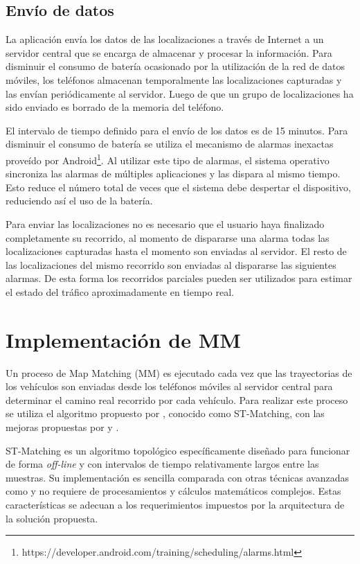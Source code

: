 \subsection{Envío de datos}

La aplicación envía los datos de las localizaciones a través de Internet a un servidor central que se encarga de almacenar y procesar la información. Para disminuir el consumo de batería ocasionado por la utilización de la red de datos móviles, los teléfonos almacenan temporalmente las localizaciones capturadas y las envían periódicamente al servidor. Luego de que un grupo de localizaciones ha sido enviado es borrado de la memoria del teléfono.

El intervalo de tiempo definido para el envío de los datos es de 15 minutos. Para disminuir el consumo de batería se utiliza el mecanismo de alarmas inexactas proveído por Android\footnote{https://developer.android.com/training/scheduling/alarms.html}. Al utilizar este tipo de alarmas, el sistema operativo sincroniza las alarmas de múltiples aplicaciones y las dispara al mismo tiempo. Esto reduce el número total de veces que el sistema debe despertar el dispositivo, reduciendo así el uso de la batería.

Para enviar las localizaciones no es necesario que el usuario haya finalizado completamente su recorrido, al momento de dispararse una alarma todas las localizaciones capturadas hasta el momento son enviadas al servidor. El resto de las localizaciones del mismo recorrido son enviadas al dispararse las siguientes alarmas. De esta forma los recorridos parciales pueden ser utilizados para estimar el estado del tráfico aproximadamente en tiempo real.

\section{Implementación de MM}
\label{implementacion_mm}

Un proceso de Map Matching (MM) es ejecutado cada vez que las trayectorias de los vehículos son enviadas desde los teléfonos móviles al servidor central para determinar el camino real recorrido por cada vehículo. Para realizar este proceso se utiliza el algoritmo propuesto por \citep{lou2009map}, conocido como ST-Matching, con las mejoras propuestas por \citep{budigm2012algorithm} y \citep{sakic2012map}. 

ST-Matching es un algoritmo topológico específicamente diseñado para funcionar de forma \emph{off-line} y con intervalos de tiempo relativamente largos entre las muestras. Su implementación es sencilla comparada con otras técnicas avanzadas como \citep{quddus2006high, newson2009hidden} y no requiere de procesamientos y cálculos matemáticos complejos. Estas características se adecuan a los requerimientos impuestos por la arquitectura de la solución propuesta. 

